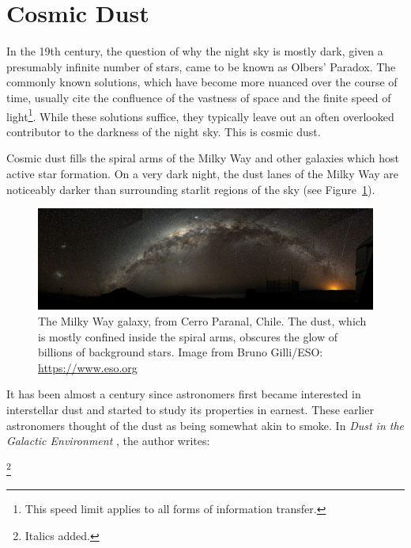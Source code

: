 \section{Cosmic Dust}

In the 19th century, the question of why the night sky is mostly dark, given a presumably infinite number of stars, came to be known as Olbers' Paradox. The commonly known solutions, which have become more nuanced over the course of time, usually cite the confluence of the vastness of space and the finite speed of light\footnote{This speed limit applies to all forms of information transfer.}. While these solutions suffice, they typically leave out an often overlooked contributor to the darkness of the night sky. This is cosmic dust.

Cosmic dust fills the spiral arms of the Milky Way and other galaxies which host active star formation. On a very dark night, the dust lanes of the Milky Way are noticeably darker than surrounding starlit regions of the sky (see Figure~\ref{fig:MW}).

\begin{figure}[!htbp]
\centering
\includegraphics[width=\textwidth]{figures/intro/Milky_Way_Arch}
\caption[The dust lane of the Milky Way galaxy.]{The Milky Way galaxy, from Cerro Paranal, Chile. The dust, which is mostly confined inside the spiral arms, obscures the glow of billions of background stars. Image from Bruno Gilli/ESO\@: \url{https://www.eso.org}}
\label{fig:MW}
\end{figure}

It has been almost a century since astronomers first became interested in interstellar dust and started to study its properties in earnest. These earlier astronomers thought of the dust as being somewhat akin to smoke. In \textit{Dust in the Galactic Environment} \citep{whittet2002dust}, the author writes:

\footnote{Italics added.}

